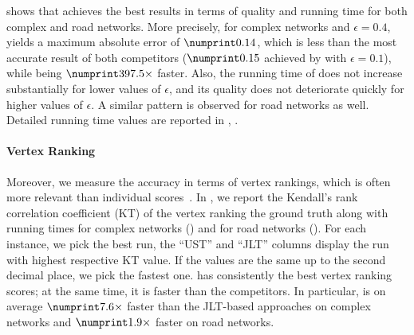  shows that \ust achieves the best
results in terms of quality and running time for both complex and road
networks. More precisely, for complex networks and $\epsilon = 0.4$, \ust
yields a maximum absolute error of $\ustMaxAbsFour$, which is less than the
most accurate result of both competitors ($\jltJuliaMaxAbsOne$ achieved by
\jltjulia with $\epsilon = 0.1$), while being $\ustJuliaFourOneSpeedup$ faster.
Also, the running time of \ust does not increase substantially for
lower values of $\epsilon$, and its quality does not deteriorate quickly for
higher values of $\epsilon$. A similar pattern is observed for road networks as
well. Detailed running time values are reported in ,
.

\paragraph{Vertex Ranking} Moreover, we measure the accuracy in terms of
vertex rankings, which is often more relevant than individual
scores~\cite{DBLP:conf/faw/OkamotoCL08,newman2018networks}.
In , we report the Kendall's rank correlation
coefficient (KT) of the vertex ranking \wrt the ground truth along with
running times for complex networks ()
and for road networks ().
%
For each instance, we pick the best run, \ie the \enquote{UST} and
\enquote{JLT} columns display the run with highest respective KT value.
If the values are the same up to the second decimal place, we pick the
fastest one. \ust has consistently the best vertex ranking scores;
at the same time, it is faster than the competitors. In particular,
\ust is on average $\ustJLTSpeedupCplx$ faster than the JLT-based approaches
on complex networks and $\ustJLTSpeedupRoad$ faster on road networks.

